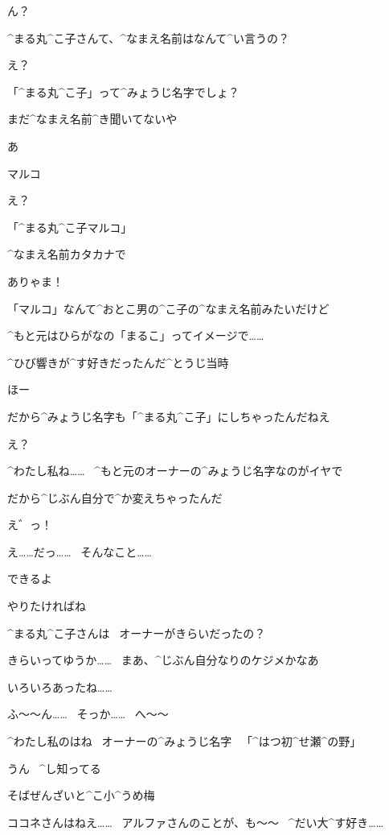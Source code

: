 \Maruko ん？

\Alpha ^{まる}{丸}^{こ}{子}さんて、^{なまえ}{名前}はなんて^{い}{言}うの？

\Maruko え？

\Alpha 「^{まる}{丸}^{こ}{子}」って^{みょうじ}{名字}でしょ？

\Alpha まだ^{なまえ}{名前}^{き}{聞}いてないや

\Maruko あ

\Maruko マルコ

\Alpha え？

\page
\Maruko 「^{まる}{丸}^{こ}{子}マルコ」

\Maruko ^{なまえ}{名前}カタカナで

\Alpha ありゃま！

\Maruko 「マルコ」なんて^{おとこ}{男}の^{こ}{子}の^{なまえ}{名前}みたいだけど

\Maruko ^{もと}{元}はひらがなの「まるこ」ってイメージで……

\Maruko ^{ひび}{響}きが^{す}{好}きだったんだ^{とうじ}{当時}

\Alpha ほー

\Maruko だから^{みょうじ}{名字}も「^{まる}{丸}^{こ}{子}」にしちゃったんだねえ

\Alpha え？

\page
\Maruko ^{わたし}{私}ね……
\ ^{もと}{元}のオーナーの^{みょうじ}{名字}なのがイヤで

\Maruko だから^{じぶん}{自分}で^{か}{変}えちゃったんだ

\Alpha え゛っ！

\Alpha え……だっ……
\ そんなこと……

\Maruko できるよ

\Maruko やりたければね

\page
\Alpha ^{まる}{丸}^{こ}{子}さんは
\ オーナーがきらいだったの？

\Maruko きらいってゆうか……
\ まあ、^{じぶん}{自分}なりのケジメかなあ

\Maruko いろいろあったね……

\Alpha ふ〜〜ん……
\ そっか……
\ へ〜〜

\Alpha ^{わたし}{私}のはね
\ オーナーの^{みょうじ}{名字}
\ 「^{はつ}{初}^{せ}{瀬}^{の}{野}」

\Maruko うん
\ ^{し}{知}ってる

\page
\Sign そばぜんざいと^{こ}{小}^{うめ}{梅}

\Maruko ココネさんはねえ……
\ アルファさんのことが、も〜〜
\ ^{だい}{大}^{す}{好}き……

